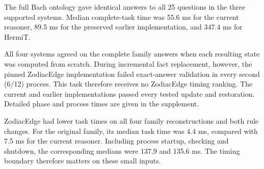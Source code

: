 The full Bach ontology gave identical answers to all 25 questions in the three supported systems. Median complete-task time was 55.6 ms for the current reasoner, 89.5 ms for the preserved earlier implementation, and 347.4 ms for HermiT.

All four systems agreed on the complete family answers when each resulting state was computed from scratch. During incremental fact replacement, however, the pinned ZodiacEdge implementation failed exact-answer validation in every second (6/12) process. This task therefore receives no ZodiacEdge timing ranking. The current and earlier implementations passed every tested update and restoration. Detailed phase and process times are given in the supplement.

ZodiacEdge had lower task times on all four family reconstructions and both rule changes. For the original family, its median task time was 4.4 ms, compared with 7.5 ms for the current reasoner. Including process startup, checking and shutdown, the corresponding medians were 137.9 and 135.6 ms. The timing boundary therefore matters on these small inputs.
